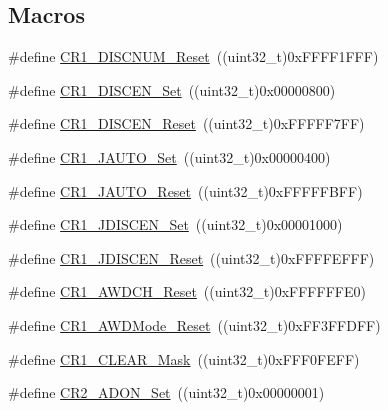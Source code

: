 \subsection*{Macros}
\begin{DoxyCompactItemize}
\item 
\#define \hyperlink{group___a_d_c___private___defines_ga88cecf0c336d950115d7a52d599de816}{C\+R1\+\_\+\+D\+I\+S\+C\+N\+U\+M\+\_\+\+Reset}~((uint32\+\_\+t)0x\+F\+F\+F\+F1\+F\+F\+F)
\item 
\#define \hyperlink{group___a_d_c___private___defines_ga95f4f653adde3407c116919c2b7d9c74}{C\+R1\+\_\+\+D\+I\+S\+C\+E\+N\+\_\+\+Set}~((uint32\+\_\+t)0x00000800)
\item 
\#define \hyperlink{group___a_d_c___private___defines_ga959f617e77853bff85ca5e8d6fba6611}{C\+R1\+\_\+\+D\+I\+S\+C\+E\+N\+\_\+\+Reset}~((uint32\+\_\+t)0x\+F\+F\+F\+F\+F7\+F\+F)
\item 
\#define \hyperlink{group___a_d_c___private___defines_gaa8478f12e212738e249a7fafb69d4dd4}{C\+R1\+\_\+\+J\+A\+U\+T\+O\+\_\+\+Set}~((uint32\+\_\+t)0x00000400)
\item 
\#define \hyperlink{group___a_d_c___private___defines_gab6c4a9f0a661bf7c5add35ea3a90b756}{C\+R1\+\_\+\+J\+A\+U\+T\+O\+\_\+\+Reset}~((uint32\+\_\+t)0x\+F\+F\+F\+F\+F\+B\+F\+F)
\item 
\#define \hyperlink{group___a_d_c___private___defines_gafef4d16c890bf5e6eb381ad01c829309}{C\+R1\+\_\+\+J\+D\+I\+S\+C\+E\+N\+\_\+\+Set}~((uint32\+\_\+t)0x00001000)
\item 
\#define \hyperlink{group___a_d_c___private___defines_gab6ffba92495342bd5f0a8b1fa216526b}{C\+R1\+\_\+\+J\+D\+I\+S\+C\+E\+N\+\_\+\+Reset}~((uint32\+\_\+t)0x\+F\+F\+F\+F\+E\+F\+F\+F)
\item 
\#define \hyperlink{group___a_d_c___private___defines_gabe7e68383d281e58707a1cd749a3374e}{C\+R1\+\_\+\+A\+W\+D\+C\+H\+\_\+\+Reset}~((uint32\+\_\+t)0x\+F\+F\+F\+F\+F\+F\+E0)
\item 
\#define \hyperlink{group___a_d_c___private___defines_gae53703f0c718ecc5b3e1a69c60af3697}{C\+R1\+\_\+\+A\+W\+D\+Mode\+\_\+\+Reset}~((uint32\+\_\+t)0x\+F\+F3\+F\+F\+D\+F\+F)
\item 
\#define \hyperlink{group___a_d_c___private___defines_ga67f7dd35ea3d1296677e5fc50b88fa90}{C\+R1\+\_\+\+C\+L\+E\+A\+R\+\_\+\+Mask}~((uint32\+\_\+t)0x\+F\+F\+F0\+F\+E\+F\+F)
\item 
\#define \hyperlink{group___a_d_c___private___defines_ga21779759f3d5d1389b114d7a1bb6fca1}{C\+R2\+\_\+\+A\+D\+O\+N\+\_\+\+Set}~((uint32\+\_\+t)0x00000001)

\end{DoxyCompactItemize}
